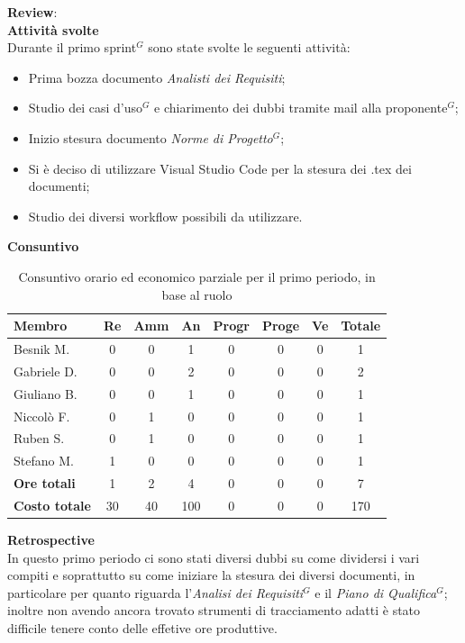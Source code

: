 \documentclass[a4paper,10pt]{article}
\begin{document}
\textbf{Review}: \\
\textbf{Attività svolte}\\
Durante il primo sprint$^G$ sono state svolte le seguenti attività:
\begin{itemize}
  \item Prima bozza documento \textit{Analisti dei Requisiti};
  \item Studio dei casi d'uso$^G$ e chiarimento dei dubbi tramite mail alla proponente$^G$;
  \item Inizio stesura documento \textit{Norme di Progetto$^G$};
  \item Si è deciso di utilizzare Visual Studio Code per la stesura dei .tex dei documenti;
  \item Studio dei diversi workflow possibili da utilizzare.
\end{itemize}
\textbf{Consuntivo}
\begin{table}[H]
\centering
\begin{tabular}{|l|c|c|c|c|c|c|c|}
\hline
\textbf{Membro} & \textbf{Re} & \textbf{Amm} & \textbf{An} & \textbf{Progr} & \textbf{Proge} & \textbf{Ve} & \textbf{Totale} \\
\hline
Besnik M.  & 0 & 0 & 1 & 0 & 0 & 0 & 1 \\
Gabriele D. & 0 & 0 & 2 & 0 & 0 & 0 & 2 \\
Giuliano B. & 0 & 0 & 1 & 0 & 0 & 0 & 1 \\
Niccolò F.  & 0 & 1 & 0 & 0 & 0 & 0 & 1 \\
Ruben S. & 0 & 1 & 0 & 0 & 0 & 0 & 1 \\
Stefano M. & 1 & 0 & 0 & 0 & 0 & 0 & 1 \\
\hline
\textbf{Ore totali} & 1 & 2 & 4 & 0 & 0 & 0 & 7 \\
\hline
\textbf{Costo totale} & 30 & 40 & 100 & 0 & 0 & 0 & 170 \\
\hline
\end{tabular}
\caption{Consuntivo orario ed economico parziale per il primo periodo, in base al ruolo}
\end{table}

\textbf{Retrospective} \\
In questo primo periodo ci sono stati diversi dubbi su come dividersi i vari compiti e soprattutto su come iniziare la stesura dei diversi documenti, in particolare per quanto riguarda l'\textit{Analisi dei Requisiti$^G$} e il \textit{Piano di Qualifica$^G$}; inoltre non avendo ancora trovato strumenti di tracciamento adatti è stato difficile tenere conto delle effetive ore produttive.
\end{document}
